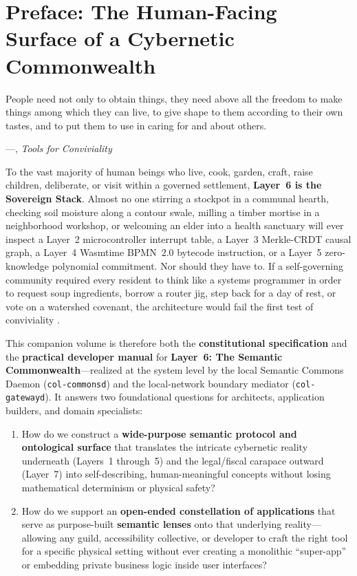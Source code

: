 \chapter*{Preface: The Human-Facing Surface of a Cybernetic Commonwealth}

\epigraph{People need not only to obtain things, they need above all the freedom to make things among which they can live, to give shape to them according to their own tastes, and to put them to use in caring for and about others.}{---\textcite{illich1973}, \textit{Tools for Conviviality}}

To the vast majority of human beings who live, cook, garden, craft, raise children, deliberate,
or visit within a governed settlement, \textbf{Layer~6 is the Sovereign Stack}. Almost no one
stirring a stockpot in a communal hearth, checking soil moisture along a contour swale, milling
a timber mortise in a neighborhood workshop, or welcoming an elder into a health sanctuary will
ever inspect a Layer~2 microcontroller interrupt table, a Layer~3 Merkle-CRDT causal graph, a
Layer~4 Wasmtime BPMN~2.0 bytecode instruction, or a Layer~5 zero-knowledge polynomial
commitment. Nor should they have to. If a self-governing community required every resident to
think like a systems programmer in order to request soup ingredients, borrow a router jig, step
back for a day of rest, or vote on a watershed covenant, the architecture would fail the first
test of conviviality \parencite{illich1973,weiser1996calm}.

This companion volume is therefore both the \textbf{constitutional specification} and the \textbf{practical
developer manual} for \textbf{Layer~6: The Semantic Commonwealth}---realized at the system level by
the local Semantic Commons Daemon (\texttt{col-commonsd}) and the local-network boundary mediator
(\texttt{col-gatewayd}). It answers two foundational questions for architects, application
builders, and domain specialists:
\begin{enumerate}
    \item How do we construct a \textbf{wide-purpose semantic protocol and ontological surface}
          that translates the intricate cybernetic reality underneath (Layers~1 through~5) and the
          legal/fiscal carapace outward (Layer~7) into self-describing, human-meaningful concepts
          without losing mathematical determinism or physical safety?
    \item How do we support an \textbf{open-ended constellation of applications} that serve as
          purpose-built \textbf{semantic lenses} onto that underlying reality---allowing any guild,
          accessibility collective, or developer to craft the right tool for a specific physical
          setting without ever creating a monolithic ``super-app'' or embedding private business
          logic inside user interfaces?
\end{enumerate}

